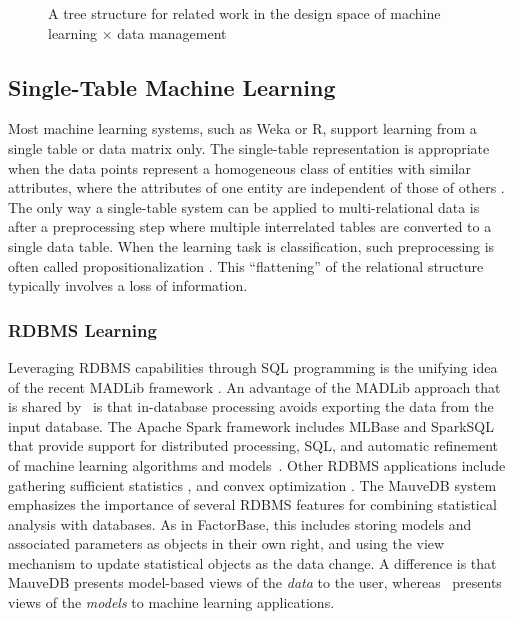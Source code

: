 \documentclass{IEEEtran}
\begin{document}
\begin{figure}[htbp] %
 \centering
{}
\caption{A tree structure for related work in the design space of machine learning $\times$ data management}
\label{fig:related}
\end{figure}


\subsection{Single-Table Machine Learning} Most machine learning systems, such as Weka or R, support learning from a single table or data matrix only. The single-table representation is appropriate when the data points represent a homogeneous class of entities with similar attributes, where the attributes of one entity are independent of those of others \cite{Kimmig2015}. The only way a single-table system can be applied to multi-relational data is after a preprocessing step where multiple interrelated tables are converted to a single data table. When the learning task is classification, such preprocessing is often called propositionalization  \cite{Kimmig2015}.  This ``flattening'' of the relational structure typically involves a loss of information.  

\subsubsection{RDBMS Learning}
Leveraging RDBMS capabilities through SQL programming 
is the unifying idea of the recent MADLib framework \cite{MADlib_VLDB_2012}. An advantage of the MADLib approach that is shared by \FB\ is that in-database processing avoids exporting the data from the input database. The Apache Spark \cite{Committers} framework includes MLBase and SparkSQL that provide support for distributed processing, SQL, and automatic refinement of machine learning algorithms and models~\cite{MLbase_ICDR_2013}.
Other RDBMS applications include gathering sufficient statistics \cite{Graefe1998}, and convex optimization \cite{Feng_SIGMOD_2012}. The MauveDB system \cite{Deshpande2006} emphasizes the importance of several RDBMS features for combining statistical analysis with databases.
As in {\sc FactorBase}, this includes 
storing models and associated parameters as objects in their own right, 
and using the view mechanism to update statistical objects as the data change.
A difference is that
MauveDB presents model-based views of the {\em data} to the user, whereas \FB\ presents views of the {\em models} to machine learning applications. 
\end{document}
